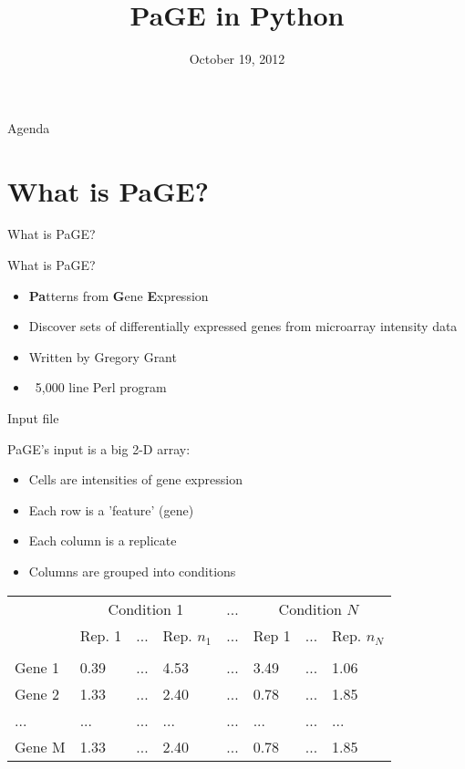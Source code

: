 \documentclass{beamer}
\title[PaGE in Python]{PaGE in Python}
\institute{University of Pennsylvania}
\date{October 19, 2012}
\begin{document}
\begin{frame}
  \titlepage
\end{frame}

\begin{frame}{Agenda}
  \tableofcontents
\end{frame}

\section{What is PaGE?}

\begin{frame}
  \begin{centering}
  {\Large{What is PaGE?}}    
  \end{centering}
\end{frame}

\begin{frame}{What is PaGE?}
  \begin{itemize}
  \item {\bf Pa}tterns from {\bf G}ene {\bf E}xpression
  \item Discover sets of differentially expressed genes from
    microarray intensity data
  \item Written by Gregory Grant
  \item ~5,000 line Perl program
  \end{itemize}
\end{frame}

\begin{frame}{Input file}
  
  PaGE's input is a big 2-D array:
  \begin{itemize}
  \item Cells are intensities of gene expression
  \item Each row is a 'feature' (gene)
  \item Each column is a replicate
  \item Columns are grouped into conditions
  \end{itemize}
  \begin{tabular}{|l|lll|l|lll|}
    & \multicolumn{3}{|c|}{Condition 1} & ... & \multicolumn{3}{|c|}{Condition $N$}\\
    & Rep. 1 & ... & Rep. $n_1$       & ... & Rep 1 & ... & Rep. $n_{N}$\\
    \hline\\
    Gene 1 & 0.39 & ... & 4.53       & ... & 3.49 & ... & 1.06 \\
    Gene 2 & 1.33 & ... & 2.40       & ... & 0.78 & ... & 1.85 \\
    ... & ... & ... & ...       & ... & ... & ... & ... \\
    Gene M & 1.33 & ... & 2.40       & ... & 0.78 & ... & 1.85 \\
    
  \end{tabular}
  
\end{frame}
\end{document}
